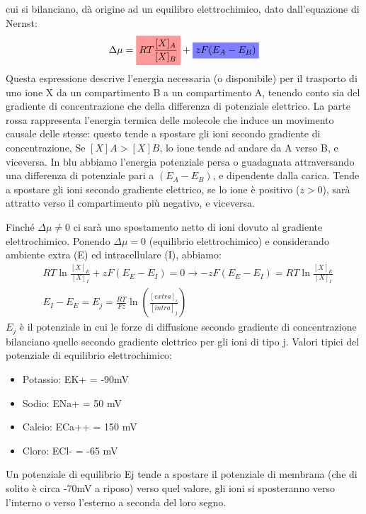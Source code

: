 cui si bilanciano, dà origine ad un equilibro
elettrochimico, dato dall’equazione di Nernst:
\begin{equation}
    \Delta\mu= \colorbox{red!40}{$\displaystyle RT\frac{[X]_A} {[X]_B}$} + \colorbox{blue!50}{$zF(E_A-E_B)$}
\end{equation}
Questa espressione descrive l’energia necessaria (o disponibile)
per il trasporto di uno ione X da un compartimento B a un
compartimento A, tenendo conto sia del gradiente di
concentrazione che della differenza di potenziale elettrico. La parte rossa rappresenta l'energia termica delle molecole che induce un movimento causale delle stesse: questo tende a spostare gli ioni secondo gradiente di concentrazione, Se $[X]A > [X]B$, lo ione tende ad andare da A verso B, e viceversa. In blu abbiamo l'energia potenziale persa o guadagnata attraversando una differenza di potenziale pari a $(E_A -E_B)$, e dipendente dalla carica. Tende a spostare gli ioni secondo gradiente
elettrico, se lo ione è positivo ($z>0$), sarà attratto verso il
compartimento più negativo, e viceversa.

\bigskip
Finché  $\Delta\mu\ne0$ ci sarà uno spostamento netto di ioni dovuto al gradiente elettrochimico. Ponendo $\Delta\mu =0$ (equilibrio elettrochimico) e considerando ambiente extra
(E) ed intracellulare (I), abbiamo:
\begin{equation}
\begin{split}
     &RT \ln \frac{[X]_E}{[X]_I} + zF(E_E - E_I) = 0 \rightarrow -zF(E_E - E_I) = RT \ln \frac{[X]_E}{[X]_I}
    \\
    &E_I - E_E = E_j = \frac{RT}{Fz} \ln \left( \frac{[extra]_i}{[intra]_j} \right)
\end{split}
\end{equation}
$E_j$ è il potenziale in cui le forze di diffusione secondo gradiente di
concentrazione bilanciano quelle secondo gradiente elettrico per gli ioni
di tipo j. Valori tipici del potenziale di equilibrio elettrochimico:
\begin{itemize}
    \item Potassio: EK+ = -90mV
\item Sodio: ENa+ = 50 mV
\item Calcio: ECa++ = 150 mV
\item Cloro: ECl- = -65 mV
\end{itemize}
Un potenziale di equilibrio Ej tende a spostare il potenziale di membrana
(che di solito è circa -70mV a riposo) verso quel valore, gli ioni si
sposteranno verso l’interno o verso l’esterno a seconda del loro segno.

